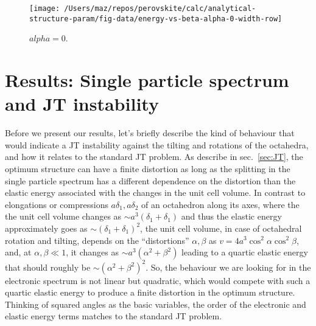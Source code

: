 \documentclass[a4paper,prb,twocolumn]{revtex4-1}  %
\begin{document}
\begin{figure}[htbp]
\begin{center}
\texttt{[image: /Users/maz/repos/perovskite/calc/analytical-structure-param/fig-data/energy-vs-beta-alpha-0-width-row]}
\caption{$alpha=0$. 
}
\label{fig:t2g-alpha0}
\end{center}
\end{figure}



\section{Results: Single particle spectrum and JT instability}
\label{sec:results}
 
 

Before we present our results,
let's briefly describe 
the kind of behaviour that would indicate a JT instability 
against the tilting and rotations of the octahedra,
and how it relates to the standard JT problem.
As describe in sec.~\ref{sec:JT},
the optimum structure can have a finite distortion
as long as 
the splitting in the single particle spectrum has a different dependence on the distortion
than the elastic energy associated with the changes in the unit cell volume.
In contrast to 
elongations or compressions 
$a\delta_1,a\delta_2$ 
of an octahedron along its axes,
where the 
 the unit cell volume changes
as $\sim a^3\left(\delta_1+\delta_1\right)$
and thus the elastic energy approximately goes
as $\sim\left(\delta_1+\delta_1\right)^2$,
the unit cell volume,
in case of octahedral rotation and tilting,
 depends on the ``distortions'' $\alpha,\beta$ 
as ${v=4a^3 \cos ^2\alpha \cos ^2\beta}$,
and, at $\alpha,\beta\ll1$,
it changes as $\sim a^3\left(\alpha ^2+\beta ^2\right)$
leading to a quartic elastic energy that should roughly be
$\sim\left(\alpha ^2+\beta ^2\right)^2$.
So, the behaviour we are looking for in the electronic spectrum 
is not linear
but quadratic, 
which would compete with such a quartic elastic energy
 to produce a finite distortion in the optimum structure.
Thinking of squared angles as the basic variables,
the order of the electronic and elastic energy terms
matches to the standard JT problem.
\end{document}
